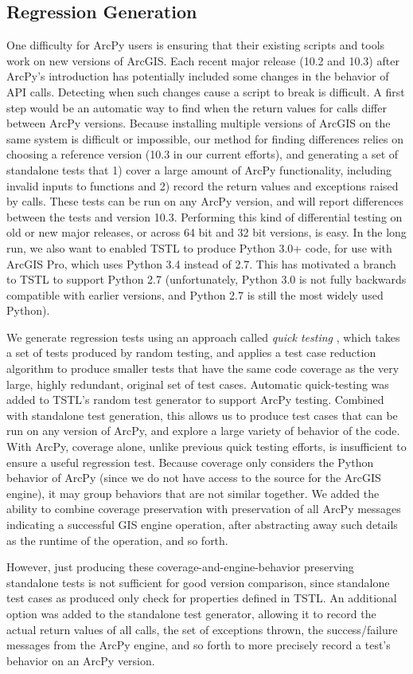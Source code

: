 \subsection{Regression Generation}

One difficulty for ArcPy users is ensuring that their existing scripts
and tools work on new versions of ArcGIS.  Each recent major release
(10.2 and 10.3) after ArcPy's introduction has potentially included some changes
in the behavior of API calls.  Detecting when such changes cause a
script to break is difficult.  A first step would be an automatic way
to find when the return values for calls differ between ArcPy
versions.
Because installing multiple versions of ArcGIS on the same system is
difficult or impossible, our method for finding differences relies on
choosing a reference version (10.3 in our current efforts), and
generating a set of standalone tests that 1) cover a large amount of
ArcPy functionality, including invalid inputs to functions and 2)
record the return values and exceptions raised by calls.  These tests
can be run on any ArcPy version, and will report differences between
the tests and version 10.3.  Performing this kind of differential
testing \cite{Differential} on old or new major releases, or across 64
bit and 32 bit versions, is easy.  In the long run, we also want to
enabled TSTL to produce Python 3.0+ code, for use with ArcGIS Pro,
which uses Python 3.4 instead of 2.7.  This has motivated a branch to
TSTL to support Python 2.7 (unfortunately, Python 3.0 is not fully
backwards compatible with earlier versions, and Python 2.7 is still
the most widely used Python).

We generate regression tests using an approach called \emph{quick
  testing} \cite{icst2014,stvrcausereduce}, which takes a set of tests
produced by random testing, and applies a test case reduction
algorithm \cite{DD} to produce smaller tests that have the same code
coverage as the very large, highly redundant, original set of test
cases.  Automatic quick-testing was added to TSTL's random test
generator to support ArcPy testing.  Combined with standalone test
generation, this allows us to produce test cases that can be run on
any version of ArcPy, and explore a large variety of behavior of the
code.  With ArcPy, coverage alone, unlike previous quick testing
efforts, is insufficient to ensure a useful regression test.  Because
coverage only considers the Python behavior of ArcPy (since we do not
have access to the source for the ArcGIS engine), it may group
behaviors that are not similar together.  We added the ability to
combine coverage preservation with preservation of all ArcPy messages
indicating a successful GIS engine operation, after abstracting away
such details as the runtime of the operation, and so forth.

However, just producing these coverage-and-engine-behavior preserving
standalone tests is not sufficient for good version comparison, since
standalone test cases as produced only check for properties defined in TSTL.  An
additional option was added to the standalone test generator, allowing
it to record the actual return values of all calls, the set of
exceptions thrown, the success/failure messages from the ArcPy engine, and so forth to more precisely record a test's
behavior on an ArcPy version.
